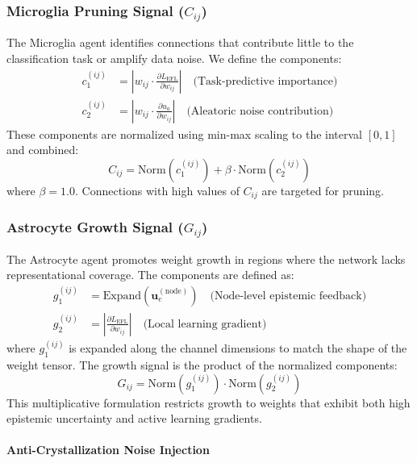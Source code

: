 \documentclass[11pt]{article}
\begin{document}
\subsubsection{Microglia Pruning Signal ($C_{ij}$)}

The Microglia agent identifies connections that contribute little to the classification task or amplify data noise. We define the components:
\begin{align}
    c_1^{(ij)} &= \left|w_{ij} \cdot \frac{\partial L_{\text{EFL}}}{\partial w_{ij}}\right| \quad \text{(Task-predictive importance)} \\
    c_2^{(ij)} &= \left|w_{ij} \cdot \frac{\partial u_a}{\partial w_{ij}}\right| \quad \text{(Aleatoric noise contribution)}
\end{align}
These components are normalized using min-max scaling to the interval $[0, 1]$ and combined:
\begin{equation}\label{eq:Cij}
    C_{ij} = \text{Norm}\left(c_1^{(ij)}\right) + \beta \cdot \text{Norm}\left(c_2^{(ij)}\right)
\end{equation}
where $\beta = 1.0$. Connections with high values of $C_{ij}$ are targeted for pruning.

\subsubsection{Astrocyte Growth Signal ($G_{ij}$)}

The Astrocyte agent promotes weight growth in regions where the network lacks representational coverage. The components are defined as:
\begin{align}
    g_1^{(ij)} &= \text{Expand}\left(\bm{u}_e^{(\text{node})}\right) \quad \text{(Node-level epistemic feedback)} \\
    g_2^{(ij)} &= \left|\frac{\partial L_{\text{EFL}}}{\partial w_{ij}}\right| \quad \text{(Local learning gradient)}
\end{align}
where $g_1^{(ij)}$ is expanded along the channel dimensions to match the shape of the weight tensor. The growth signal is the product of the normalized components:
\begin{equation}\label{eq:Gij}
    G_{ij} = \text{Norm}\left(g_1^{(ij)}\right) \cdot \text{Norm}\left(g_2^{(ij)}\right)
\end{equation}
This multiplicative formulation restricts growth to weights that exhibit both high epistemic uncertainty and active learning gradients.

\paragraph{Anti-Crystallization Noise Injection}
\end{document}
